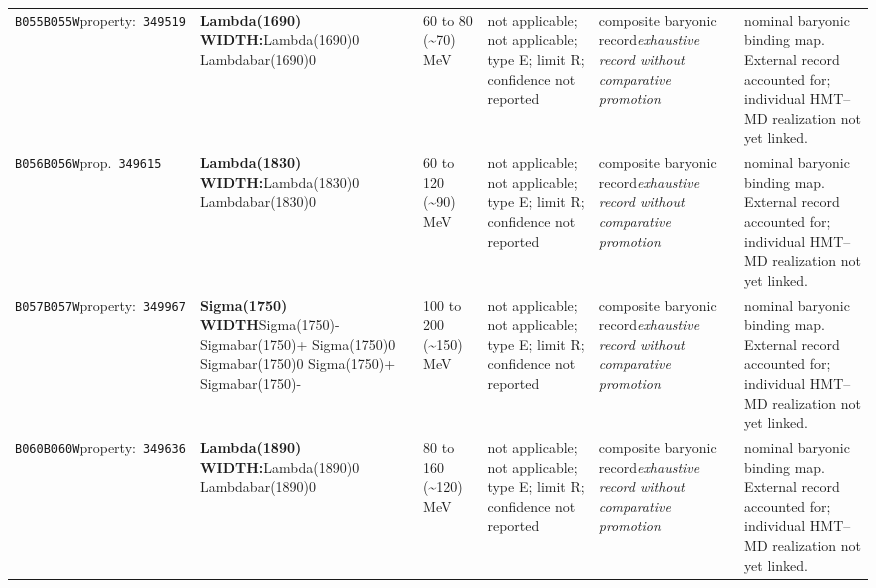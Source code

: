 \begin{landscape}
\begin{longtable}{L{1.85cm}L{4.45cm}L{2.35cm}L{4.05cm}L{3.35cm}L{7.15cm}}
\texttt{B055}\newline \texttt{B055W}\newline property:\ \texttt{349519} & \textbf{Lambda(1690) WIDTH:}\newline Lambda(1690)0 \textbar{}\allowbreak{} Lambdabar(1690)0 & 60 to 80 (\textasciitilde{}70)\,MeV & not applicable; not applicable; type E; limit R; confidence not reported & composite baryonic record\newline \emph{exhaustive record without comparative promotion} & nominal baryonic binding map. External record accounted for; individual HMT--MD realization not yet linked. \\
\texttt{B056}\newline \texttt{B056W}\newline prop.\ \texttt{349615} & \textbf{Lambda(1830) WIDTH:}\newline Lambda(1830)0 \textbar{}\allowbreak{} Lambdabar(1830)0 & 60 to 120 (\textasciitilde{}90)\,MeV & not applicable; not applicable; type E; limit R; confidence not reported & composite baryonic record\newline \emph{exhaustive record without comparative promotion} & nominal baryonic binding map. External record accounted for; individual HMT--MD realization not yet linked. \\
\texttt{B057}\newline \texttt{B057W}\newline property:\ \texttt{349967} & \textbf{Sigma(1750) WIDTH}\newline Sigma(1750)- \textbar{}\allowbreak{} Sigmabar(1750)+ \textbar{}\allowbreak{} Sigma(1750)0 \textbar{}\allowbreak{} Sigmabar(1750)0 \textbar{}\allowbreak{} Sigma(1750)+ \textbar{}\allowbreak{} Sigmabar(1750)- & 100 to 200 (\textasciitilde{}150)\,MeV & not applicable; not applicable; type E; limit R; confidence not reported & composite baryonic record\newline \emph{exhaustive record without comparative promotion} & nominal baryonic binding map. External record accounted for; individual HMT--MD realization not yet linked. \\
\texttt{B060}\newline \texttt{B060W}\newline property:\ \texttt{349636} & \textbf{Lambda(1890) WIDTH:}\newline Lambda(1890)0 \textbar{}\allowbreak{} Lambdabar(1890)0 & 80 to 160 (\textasciitilde{}120)\,MeV & not applicable; not applicable; type E; limit R; confidence not reported & composite baryonic record\newline \emph{exhaustive record without comparative promotion} & nominal baryonic binding map. External record accounted for; individual HMT--MD realization not yet linked. \\

\end{longtable}
\end{landscape}
